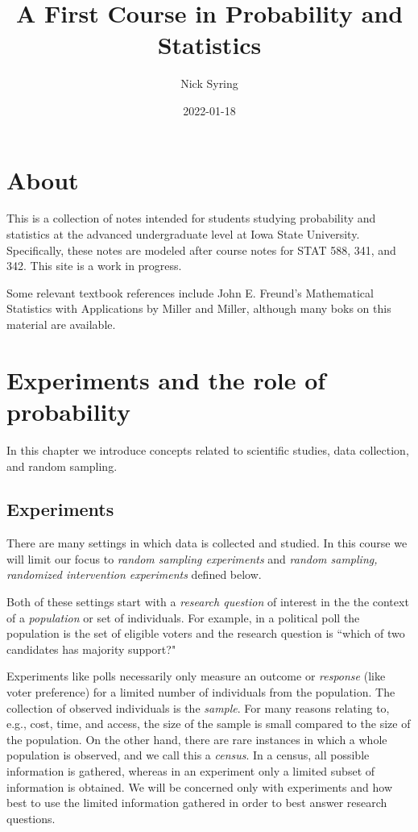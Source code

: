 \documentclass[
]{book}
\title{A First Course in Probability and Statistics}
\author{Nick Syring}
\date{2022-01-18}
\theoremstyle{definition}
\theoremstyle{definition}
\theoremstyle{definition}
\theoremstyle{definition}
\theoremstyle{remark}
\begin{document}
\maketitle

{
\setcounter{tocdepth}{1}
\tableofcontents
}
\hypertarget{about}{%
\chapter{About}\label{about}}

This is a collection of notes intended for students studying probability and statistics at the advanced undergraduate level at Iowa State University. Specifically, these notes are modeled after course notes for STAT 588, 341, and 342. This site is a work in progress.

Some relevant textbook references include John E. Freund's Mathematical Statistics with Applications by Miller and Miller, although many boks on this material are available.

\hypertarget{experiments-and-the-role-of-probability}{%
\chapter{Experiments and the role of probability}\label{experiments-and-the-role-of-probability}}

In this chapter we introduce concepts related to scientific studies, data collection, and random sampling.

\hypertarget{experiments}{%
\section{Experiments}\label{experiments}}

There are many settings in which data is collected and studied. In this course we will limit our focus to \emph{random sampling experiments} and \emph{random sampling, randomized intervention experiments} defined below.

Both of these settings start with a \emph{research question} of interest in the the context of a \emph{population} or set of individuals. For example, in a political poll the population is the set of eligible voters and the research question is ``which of two candidates has majority support?"

Experiments like polls necessarily only measure an outcome or \emph{response} (like voter preference) for a limited number of individuals from the population. The collection of observed individuals is the \emph{sample}. For many reasons relating to, e.g., cost, time, and access, the size of the sample is small compared to the size of the population. On the other hand, there are rare instances in which a whole population is observed, and we call this a \emph{census}. In a census, all possible information is gathered, whereas in an experiment only a limited subset of information is obtained. We will be concerned only with experiments and how best to use the limited information gathered in order to best answer research questions.
\end{document}
